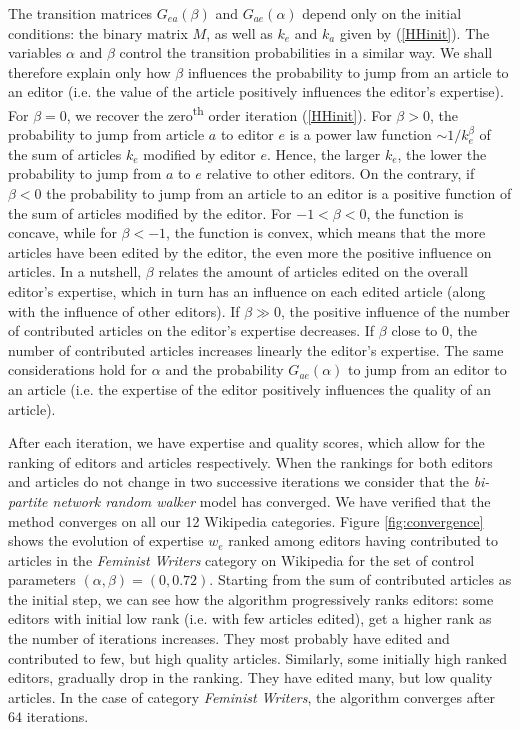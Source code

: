 The transition matrices $G_{ea}(\beta)$ and $G_{ae}(\alpha)$ depend only on the initial conditions: the binary matrix $M$, as well as $k_e$ and $k_a$ given by (\ref{HHinit}). The variables $\alpha$ and $\beta$ control the transition probabilities in a similar way. We shall therefore explain only how $\beta$ influences the probability to jump from an article to an editor (i.e. the value of the article positively influences the editor's expertise). For $\beta = 0$, we recover the zero\textsuperscript{th} order iteration (\ref{HHinit}). For $\beta > 0$, the probability to jump from article $a$ to editor $e$ is a power law function $\sim 1/k_{e}^{\beta}$ of the sum of articles $k_{e}$  modified by editor $e$. Hence, the larger $k_{e}$, the lower the probability to jump from $a$ to $e$ relative to other editors. On the contrary, if $\beta < 0$ the probability to jump from an article to an editor is a positive function of the sum of articles modified by the editor. For $-1 < \beta < 0$, the function is concave, while for $\beta < -1$, the function is convex, which means that the more articles have been edited by the editor, the even more the positive influence on articles. In a nutshell, $\beta$ relates the amount of articles edited on the overall editor's expertise, which in turn has an influence on each edited article (along with the influence of other editors). If $\beta \gg 0$, the positive influence of the number of contributed articles on the editor's expertise decreases. If $\beta$ close to $0$, the number of contributed articles increases linearly the editor's expertise. The same considerations hold for $\alpha$ and the probability $G_{ae}(\alpha)$ to jump from an editor to an article (i.e. the expertise of the editor positively influences the quality of an article).

After each iteration, we have expertise and quality scores, which allow for the ranking of editors and articles respectively. When the rankings for both editors and articles do not change in two successive iterations we consider that the {\it bi-partite network random walker} model has converged. We have verified that the method converges on all our 12 Wikipedia categories.  Figure \ref{fig:convergence} shows the evolution of expertise $w_e$ ranked among editors having contributed to articles in the {\it Feminist Writers} category on Wikipedia for the set of control parameters $(\alpha,\beta) =(0, 0.72)$. Starting from the sum of contributed articles as the initial step, we can see how the algorithm progressively ranks editors: some editors with initial low rank (i.e. with few articles edited), get a higher rank as the number of iterations increases. They most probably have edited and contributed to few, but high quality articles. Similarly, some initially high ranked editors, gradually drop in the ranking. They have edited many, but low quality articles. In the case of category {\it Feminist Writers}, the algorithm converges after $64$ iterations.

